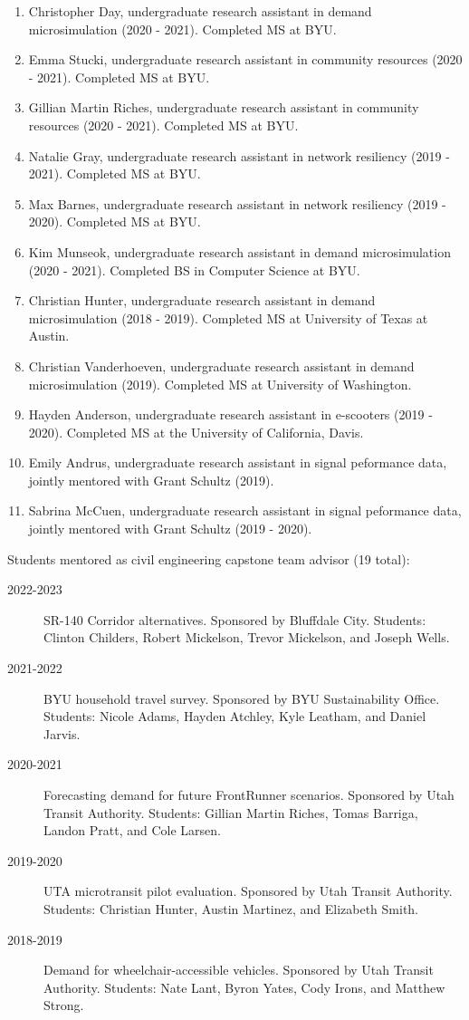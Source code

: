 \documentclass[margin,line]{res}
\newcounter{enuminitialize}
\newenvironment{myenum}[1][]
{%
 \setcounter{enuminitialize}{#1}
 \addtocounter{enuminitialize}{2}
 \begin{enumerate}[left= 4pt, itemsep=12pt, start=\value{enuminitialize}, label=\arabic*\addtocounter{enumi}{-2}]
}
{%
 \end{enumerate}
}
\begin{document}
\begin{resume}
\begin{myenum}[25]
  \item Christopher Day, undergraduate research assistant in demand microsimulation (2020 - 2021). Completed MS at BYU.
  \item Emma Stucki, undergraduate research assistant in community resources (2020 - 2021). Completed MS at BYU.
  \item Gillian Martin Riches, undergraduate research assistant in community resources (2020 - 2021). Completed MS at BYU.
  \item Natalie Gray, undergraduate research assistant in network resiliency (2019 - 2021). Completed MS at BYU.
  \item Max Barnes, undergraduate research assistant in network resiliency (2019 - 2020). Completed MS at BYU.
  \item Kim Munseok, undergraduate research assistant in demand microsimulation (2020 - 2021). Completed BS in Computer Science at BYU.
  \item Christian Hunter, undergraduate research assistant in demand microsimulation (2018 - 2019). Completed MS at University of Texas at Austin.
  \item Christian Vanderhoeven, undergraduate research assistant in demand microsimulation (2019). Completed MS at University of Washington.
  \item Hayden Anderson, undergraduate research assistant in e-scooters (2019 - 2020). Completed MS at the University of California, Davis.
  \item Emily Andrus, undergraduate research assistant in signal peformance data, jointly mentored with Grant Schultz (2019).
  \item Sabrina McCuen, undergraduate research assistant in signal peformance data, jointly mentored with Grant Schultz (2019 - 2020).
\end{myenum}


Students mentored as civil engineering capstone team advisor (19 total):
\vspace{0.2cm}
\begin{description}
  \item[2022-2023] SR-140 Corridor alternatives. Sponsored by Bluffdale City. Students:
    Clinton Childers, Robert Mickelson, Trevor Mickelson, and Joseph Wells.
  \item[2021-2022] BYU household travel survey. Sponsored by BYU Sustainability Office. Students: Nicole Adams, Hayden Atchley, Kyle Leatham, and Daniel Jarvis.
  \item[2020-2021] Forecasting demand for future FrontRunner scenarios. Sponsored by Utah Transit Authority. Students: Gillian Martin Riches, Tomas Barriga, Landon Pratt, and Cole Larsen.
  \item[2019-2020] UTA microtransit pilot evaluation. Sponsored by Utah Transit Authority. Students: Christian Hunter, Austin Martinez, and Elizabeth Smith.
  \item[2018-2019] Demand for wheelchair-accessible vehicles. Sponsored by Utah Transit Authority. Students: Nate Lant, Byron Yates, Cody Irons, and Matthew Strong.
\end{description}



\end{resume}
\end{document}
